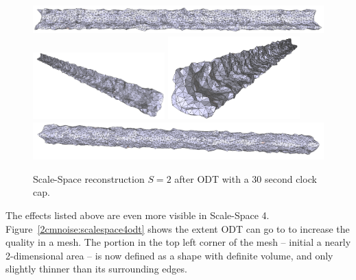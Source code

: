 \documentclass[12pt]{drexelthesis}
\begin{document}
\begin{figure}[!ht]
	
	\centering
		\includegraphics[width=5in]{simulated-lab-scan/2cmnoise/optimizedNeat/scalespace2odt00.png}
		\includegraphics[width=2in]{simulated-lab-scan/2cmnoise/optimizedNeat/scalespace2odt01.png}
		\includegraphics[width=2in]{simulated-lab-scan/2cmnoise/optimizedNeat/scalespace2odt02.png}
		\includegraphics[width=5in]{simulated-lab-scan/2cmnoise/optimizedNeat/scalespace2odt03.png}
		\caption[Scale-Space reconstruction $S = 2$ after ODT with a 30 second clock cap]{\centering Scale-Space reconstruction $S = 2$ after ODT with a 30 second clock cap.}
	\label{2cmnoise:scalespace2odt}
\end{figure}

The effects listed above are even more visible in Scale-Space 4. Figure~\ref{2cmnoise:scalespace4odt} shows the extent ODT can go to to increase the quality in a mesh. The portion in the top left corner of the mesh -- initial a nearly 2-dimensional area -- is now defined as a shape with definite volume, and only slightly thinner than its surrounding edges.
\end{document}
